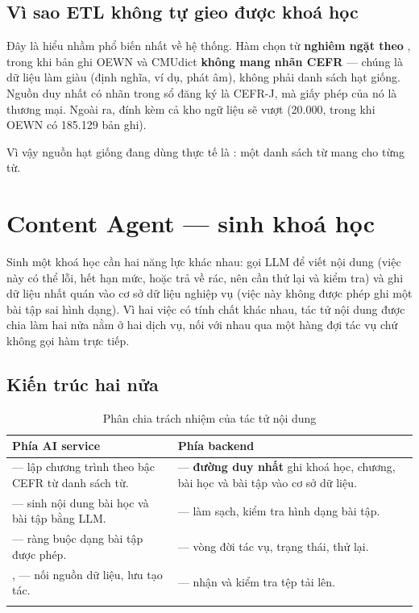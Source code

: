 \subsection{Vì sao ETL không tự gieo được khoá học}

Đây là hiểu nhầm phổ biến nhất về hệ thống. Hàm  chọn từ
\textbf{nghiêm ngặt theo} , trong khi bản ghi OEWN và CMUdict
\textbf{không mang nhãn CEFR} — chúng là dữ liệu làm giàu (định nghĩa, ví dụ, phát âm),
không phải danh sách hạt giống. Nguồn duy nhất có nhãn trong sổ đăng ký là CEFR-J, mà
giấy phép của nó là thương mại. Ngoài ra, đính kèm cả kho ngữ liệu sẽ vượt
 (20.000, trong khi OEWN có 185.129 bản ghi).

Vì vậy nguồn hạt giống đang dùng thực tế là : một danh sách từ mang
 cho từng từ.

\section{Content Agent — sinh khoá học}

Sinh một khoá học cần hai năng lực khác nhau: gọi LLM để viết nội dung (việc này có thể
lỗi, hết hạn mức, hoặc trả về rác, nên cần thử lại và kiểm tra) và ghi dữ liệu nhất quán
vào cơ sở dữ liệu nghiệp vụ (việc này không được phép ghi một bài tập sai hình dạng). Vì
hai việc có tính chất khác nhau, tác tử nội dung được chia làm hai nửa nằm ở hai dịch vụ,
nối với nhau qua một hàng đợi tác vụ chứ không gọi hàm trực tiếp.

\subsection{Kiến trúc hai nửa}

\begin{longtable}{L{5.2cm} L{8.4cm}}
\toprule
\textbf{Phía AI service} & \textbf{Phía backend}\\
\midrule
\endhead
{} — lập chương trình theo bậc CEFR từ danh sách từ. &
 — \textbf{đường duy nhất} ghi khoá học, chương, bài học và bài tập vào cơ sở dữ liệu.\\
 — sinh nội dung bài học và bài tập bằng LLM. &
 — làm sạch, kiểm tra hình dạng bài tập.\\
 — ràng buộc dạng bài tập được phép. &
 — vòng đời tác vụ, trạng thái, thử lại.\\
,  — nối nguồn dữ liệu, lưu tạo tác. &
 — nhận và kiểm tra tệp tải lên.\\
\bottomrule
\caption{Phân chia trách nhiệm của tác tử nội dung}
\end{longtable}


